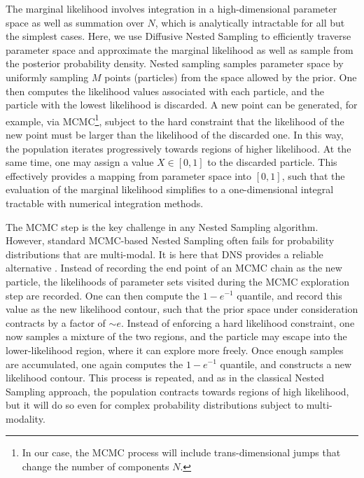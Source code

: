 \documentclass[12pt]{emulateapj}
\begin{document}

The marginal likelihood involves integration in a high-dimensional parameter space as well as summation over $N$, which is analytically intractable for all but the
simplest cases. Here, we use Diffusive Nested Sampling \citep[DNS; ]{brewer2011} to efficiently traverse parameter space and approximate the marginal 
likelihood as well as sample from the posterior probability density. 
Nested sampling \citep{skilling2006} samples parameter space by uniformly sampling $M$ points (particles) from the space allowed by the prior. 
One then computes the likelihood values associated with each particle, and the particle with the lowest likelihood is discarded. A new point
can be generated, for example, via MCMC\footnote{In our case, the MCMC process will include trans-dimensional jumps that change the number of components $N$.}, subject to the hard constraint that the
likelihood of the new point must be larger than the likelihood of the discarded one. In this way, the population iterates progressively towards
regions of higher likelihood. At the same time, one may assign a value $X  \in [0, 1]$ to the discarded particle. This effectively provides a 
mapping from parameter space into $[0,1]$, such that the evaluation of the marginal likelihood simplifies to a one-dimensional 
integral tractable with numerical integration methods.

The MCMC step is the key challenge in any Nested Sampling algorithm. However, standard MCMC-based Nested Sampling often fails for probability distributions that
are multi-modal. It is here that DNS provides a reliable alternative \citep[for details, see][]{brewer2011}. 
Instead of recording the end point of an MCMC chain as the new particle, the likelihoods of parameter sets visited during the MCMC exploration step
 are recorded. One can then compute the $1-e^{-1}$ quantile, and record this value as the new likelihood contour, such that the prior space
 under consideration contracts by a factor of $\sim e$. Instead of enforcing a hard likelihood constraint, one now samples a mixture of the 
 two regions, and the particle may escape into the lower-likelihood region, where it can explore more freely. Once enough samples are accumulated,
 one again computes the $1-e^{-1}$ quantile, and constructs a new likelihood contour. This process is repeated, and as in the classical Nested Sampling
 approach, the population contracts towards regions of high likelihood, but it will do so even for complex probability distributions subject to multi-modality.
\end{document}
